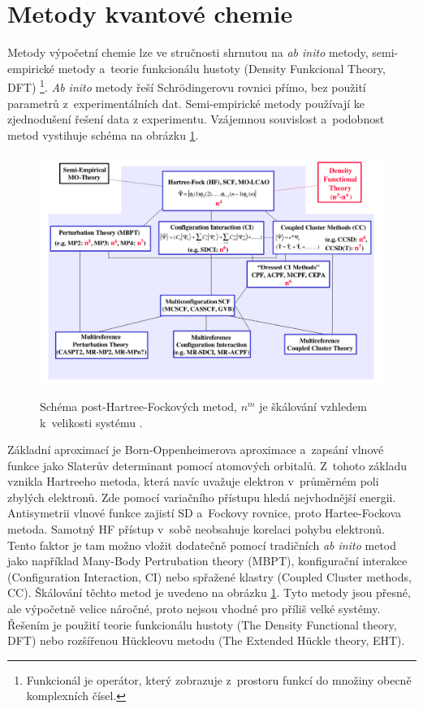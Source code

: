 \documentclass[
  printed, %
  table,   %
  lof,     %
  lot,     %
  oneside,
]{fithesis3}
\begin{document}
\section{Metody kvantové chemie}
Metody výpočetní chemie lze ve stručnosti shrnutou na \textit{ab inito} metody, semi-empirické metody a~teorie funkcionálu hustoty (Density Funkcional Theory, DFT) \footnote{Funkcionál je operátor, který zobrazuje z~prostoru funkcí do množiny obecně komplexních čísel.}. \textit{Ab inito} metody řeší Schrödingerovu rovnici přímo, bez použití parametrů z~experimentálních dat. Semi-empirické metody používají ke zjednodušení řešení data z experimentu. Vzájemnou souvislost a~podobnost metod vystihuje schéma na obrázku \ref{schema_QM}.
 \begin{figure}[h]
\caption{Schéma post-Hartree-Fockových metod, $n^m$ je škálování vzhledem k~velikosti systému \cite{pdf_obrazek}. }
  \center
  \includegraphics[width=12cm]{schema_QM.png}
  \label{schema_QM}
  \end{figure}
     Základní aproximací je Born-Oppenheimerova aproximace a~zapsání vlnové funkce jako Slaterův determinant pomocí atomových orbitalů. Z~tohoto základu vznikla Hartreeho metoda, která navíc uvažuje elektron v~průměrném poli zbylých elektronů. Zde pomocí variačního přístupu hledá nejvhodnější energii. Antisymetrii vlnové funkce zajistí SD a~Fockovy rovnice, proto Hartee-Fockova metoda. Samotný HF přístup v~sobě neobsahuje korelaci pohybu elektronů. Tento faktor je tam možno vložit dodatečně pomocí tradičních \textit{ab inito} metod jako například Many-Body Pertrubation  theory (MBPT), konfigurační interakce (Configuration Interaction, CI) nebo spřažené klastry (Coupled Cluster methods, CC). Škálování těchto metod je uvedeno na obrázku \ref{schema_QM}. Tyto metody jsou přesné, ale výpočetně velice náročné, proto nejsou vhodné pro příliš velké systémy. Řešením je použití teorie funkcionálu hustoty (The Density Functional theory, DFT) nebo rozšířenou Hückleovu metodu (The Extended Hückle theory, EHT).
\end{document}
